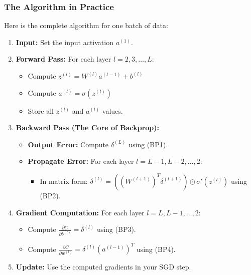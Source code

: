 \documentclass[xcolor=svgnames, 10pt, handout]{beamer}
\begin{document}
\begin{frame}
\frametitle{The Algorithm in Practice}

Here is the complete algorithm for one batch of data:

\begin{enumerate}
    \item \textbf{Input:} Set the input activation $a^{(1)}$.
    
    \item \textbf{Forward Pass:} For each layer $l = 2, 3, \ldots, L$:
    \begin{itemize}
        \item Compute $z^{(l)} = W^{(l)}a^{(l-1)} + b^{(l)}$
        \item Compute $a^{(l)} = \sigma(z^{(l)})$
        \item Store all $z^{(l)}$ and $a^{(l)}$ values.
    \end{itemize}
    
    \item \textbf{Backward Pass (The Core of Backprop):}
    \begin{itemize}
        \item \textbf{Output Error:} Compute $\delta^{(L)}$ using (BP1).
        \item \textbf{Propagate Error:} For each layer $l = L-1, L-2, \ldots, 2$:
        \begin{itemize}
            \item In matrix form: $\delta^{(l)} = ((W^{(l+1)})^T \delta^{(l+1)}) \odot \sigma'(z^{(l)})$ using (BP2).
        \end{itemize}
    \end{itemize}
    
    \item \textbf{Gradient Computation:} For each layer $l = L, L-1, \ldots, 2$:
    \begin{itemize}
        \item Compute $\frac{\partial C}{\partial b^{(l)}} = \delta^{(l)}$ using (BP3).
        \item Compute $\frac{\partial C}{\partial w^{(l)}} = \delta^{(l)} (a^{(l-1)})^T$ using (BP4).
    \end{itemize}
    
    \item \textbf{Update:} Use the computed gradients in your SGD step.
\end{enumerate}

\end{frame}
\end{document}

